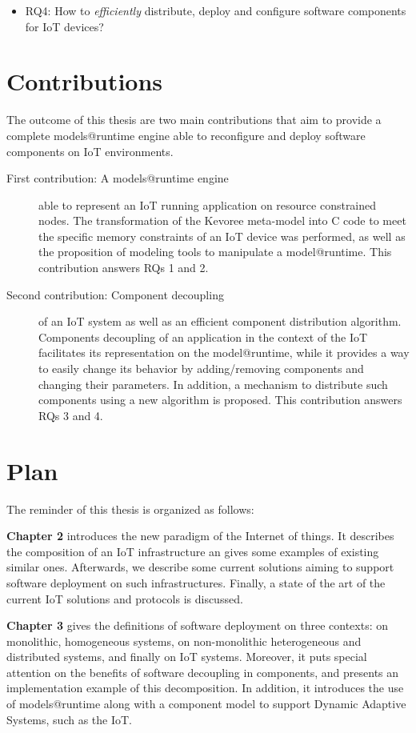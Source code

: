 \begin{itemize}
	\item RQ4: How to \textit{efficiently} distribute, deploy and configure software components for IoT devices?
\end{itemize}

\section{Contributions}
The outcome of this thesis are two main contributions that aim to provide a complete models@runtime engine able to reconfigure and deploy software components on IoT environments.
\begin{description}
	\item[First contribution: A models@runtime engine] able to represent an IoT running application on resource constrained nodes. The transformation of the Kevoree meta-model into C code to meet the specific memory constraints of an IoT device was performed, as well as the proposition of modeling tools to manipulate a model@runtime.
	This contribution answers RQs 1 and 2.
	\item[Second contribution: Component decoupling] of an IoT system as well as an efficient component distribution algorithm. Components decoupling of an application in the context of the IoT facilitates its representation on the model@runtime, while it provides a way to easily change its behavior by adding/removing components and changing their parameters.
	In addition, a mechanism to distribute such components using a new algorithm is proposed.
	This contribution answers RQs 3 and 4.
\end{description}

\section{Plan}
The reminder of this thesis is organized as follows:

\textbf{Chapter 2} introduces the new paradigm of the Internet of things. It describes the composition of an IoT infrastructure an gives some examples of existing similar ones.
Afterwards, we describe some current solutions aiming to support software deployment on such infrastructures.
Finally, a state of the art of the current IoT solutions and protocols is discussed.

\textbf{Chapter 3} gives the definitions of software deployment on three contexts: on monolithic, homogeneous systems, on non-monolithic heterogeneous and distributed systems, and finally on IoT systems.
Moreover, it puts special attention on the benefits of software decoupling in components, and presents an implementation example of this decomposition.
In addition, it introduces the use of models@runtime along with a component model to support Dynamic Adaptive Systems, such as the IoT.


